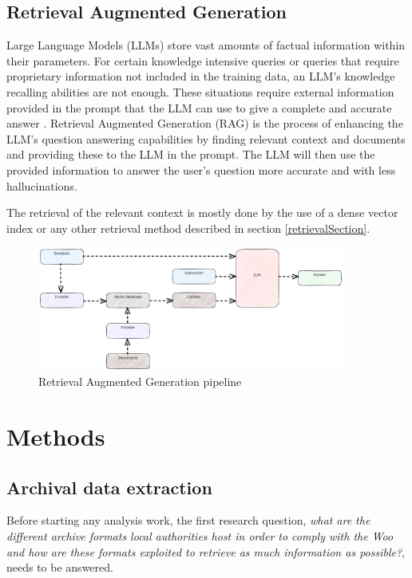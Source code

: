 \documentclass[twoside]{uva-inf-bachelor-thesis}
\begin{document}

\section{Retrieval Augmented Generation}
Large Language Models (LLMs) store vast amounts of factual information within their parameters. For certain knowledge intensive queries or queries that require proprietary information not included in the training data, an LLM's knowledge recalling abilities are not enough. These situations require external information provided in the prompt that the LLM can use to give a complete and accurate answer \cite{NEURIPS2020_6b493230}. Retrieval Augmented Generation (RAG) is the process of enhancing the LLM's question answering capabilities by finding relevant context and documents and providing these to the LLM in the prompt. The LLM will then use the provided information to answer the user's question more accurate and with less hallucinations.

The retrieval of the relevant context is mostly done by the use of a dense vector index or any other retrieval method described in section \ref{retrievalSection}.

\begin{figure}
    \centering
    \includegraphics[width=0.9\textwidth]{images/rag.png}
    \caption{Retrieval Augmented Generation pipeline}
    \label{fig:rag}
\end{figure}


\chapter{Methods}
\section{Archival data extraction}
Before starting any analysis work, the first research question, \textit{what are the different archive formats local authorities host in order to comply with the Woo and how are these formats exploited to retrieve as much information as possible?}, needs to be answered.
\end{document}
